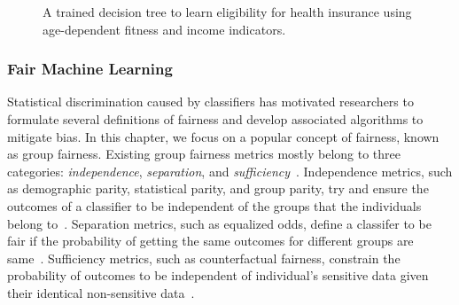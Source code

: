 \begin{figure}
\begin{minipage}{.33\columnwidth}
	\end{minipage}\hspace*{-2em}
	\begin{minipage}{.35\columnwidth}
	\end{minipage}%
	\caption[A decision tree classifier on sensitive and non-sensitive features]{A trained decision tree to learn eligibility for health insurance using age-dependent fitness and income indicators.}\label{fairness_justicia_fig:fair_example}%
\end{figure}


\subsubsection{Fair Machine Learning} Statistical discrimination caused by classifiers has motivated researchers to formulate several definitions of fairness and develop associated algorithms to mitigate bias. In this chapter, we focus on a popular concept of fairness, known as group fairness.  Existing group fairness metrics mostly belong to three categories: \textit{independence}, \textit{separation}, and \textit{sufficiency}~\cite{mehrabi2019survey}. Independence metrics, such as demographic parity, statistical parity, and group parity, try and ensure the outcomes of a classifier to be independent of the groups that the individuals belong to~\cite{feldman2015certifying,dwork2012fairness}. Separation metrics, such as equalized odds, define a classifer to be fair if the probability of getting the same outcomes for different groups are same~\cite{hardt2016equality}. Sufficiency metrics, such as counterfactual fairness, constrain the probability of outcomes to be independent of individual's sensitive data given their identical non-sensitive data~\cite{kusner2017counterfactual}.

